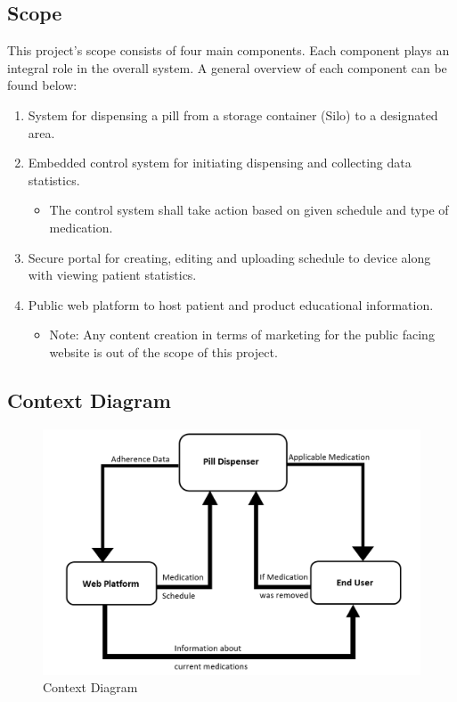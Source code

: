\documentclass[12pt,titlepage]{article}
\begin{document}
\subsection{Scope}
This project's scope consists of four main components. Each component plays an integral role in the overall system. A general overview of each component can be found below:
\begin{enumerate}
    \item System for dispensing a pill from a storage container (Silo)  to a designated area.
    \item Embedded control system for initiating dispensing and collecting data statistics.
    \begin{itemize}
        \item The control system shall take action based on given schedule and type of medication.
    \end{itemize}
    \item Secure portal for creating, editing and uploading schedule to device along with viewing patient statistics.
    \item Public web platform to host patient and product educational information.
    \begin{itemize}
        \item Note: Any content creation in terms of marketing for the public facing website is out of the scope of this project. 
    \end{itemize}
\end{enumerate}

\pagebreak
\subsection{Context Diagram}
 \begin{figure}[h]
  \centering
  \includegraphics[width=.8\linewidth]{ContextDiagram.png}
  \caption{Context Diagram}
\end{figure}
\end{document}
